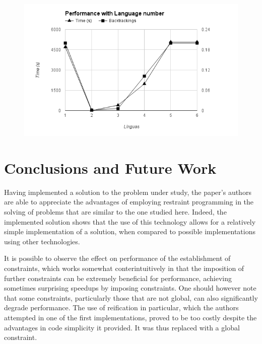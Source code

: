 \documentclass{llncs}
\begin{document}
\begin{figure}[h]
  \centering
    \includegraphics[width=1\textwidth]{language.png}
\end{figure}
 
\FloatBarrier
 \section{Conclusions and Future Work}
 Having implemented a solution to the problem under study, the paper's authors are able to appreciate the advantages of employing restraint programming in the solving of problems that are similar to the one studied here. Indeed, the implemented solution shows that the use of this technology allows for a relatively simple implementation of a solution, when compared to possible implementations using other technologies.

It is possible to observe the effect on performance of the establishment of constraints, which works somewhat conterintuitively in that the imposition of further constraints can be extremely beneficial for performance, achieving sometimes surprising speedups by imposing constraints. One should however note that some constraints, particularly those that are not global, can also significantly degrade performance. The use of reification in particular, which the authors attempted in one of the first implementations, proved to be too costly despite the advantages in code simplicity it provided. It was thus replaced with a global constraint.  
\end{document}
